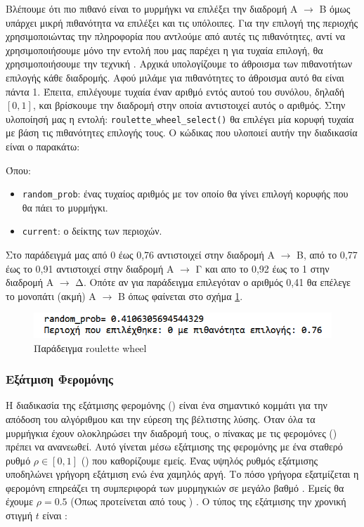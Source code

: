 Βλέπουμε ότι πιο πιθανό είναι το μυρμήγκι να επιλέξει την διαδρομή Α $\rightarrow$ Β όμως υπάρχει μικρή πιθανότητα να επιλέξει και τις υπόλοιπες. Για την επιλογή της περιοχής χρησιμοποιώντας την πληροφορία που αντλούμε από αυτές τις πιθανότητες, αντί να χρησιμοποιήσουμε μόνο την εντολή  που μας παρέχει η  για τυχαία επιλογή, θα χρησιμοποιήσουμε την τεχνική  \cite{lipowski2012roulette}. Αρχικά υπολογίζουμε το άθροισμα των πιθανοτήτων επιλογής κάθε διαδρομής. Αφού μιλάμε για πιθανότητες το άθροισμα αυτό θα είναι πάντα 1. Έπειτα, επιλέγουμε τυχαία έναν αριθμό εντός αυτού του συνόλου, δηλαδή $[0,1]$, και βρίσκουμε την διαδρομή στην οποία αντιστοιχεί αυτός ο αριθμός.
Στην υλοποίησή μας η εντολή: \verb|roulette_wheel_select()| θα επιλέγει μία κορυφή τυχαία με βάση τις πιθανότητες επιλογής τους. Ο κώδικας που υλοποιεί αυτήν την διαδικασία είναι ο παρακάτω: 

Όπου:
\begin{itemize}
    \item \verb|random_prob|: ένας τυχαίος αριθμός με τον οποίο θα γίνει επιλογή κορυφής που θα πάει το μυρμήγκι.
    \item \verb|current|: ο δείκτης των περιοχών.
\end{itemize}

Στο παράδειγμά μας από 0 έως 0,76 αντιστοιχεί στην διαδρομή Α $\rightarrow$ Β, από το 0,77 έως το 0,91 αντιστοιχεί στην διαδρομή Α $\rightarrow$ Γ και απο το 0,92 έως το 1 στην διαδρομή Α $\rightarrow$ Δ. Οπότε αν για παράδειγμα επιλεγόταν ο αριθμός 0,41 θα επέλεγε το μονοπάτι (ακμή) Α $\rightarrow$ Β όπως φαίνεται στο σχήμα \ref{roulette}.

\begin{figure}[b]
    \centering
    \includegraphics[scale=0.9]{2947_thesis/pictures/roulette_wheel_example.png} 
    \caption{Παράδειγμα roulette wheel}
    \label{roulette}
\end{figure}

\subsubsection{Εξάτμιση Φερομόνης}

Η διαδικασία της εξάτμισης φερομόνης () είναι ένα σημαντικό κομμάτι για την απόδοση του αλγόριθμου και την εύρεση της βέλτιστης λύσης. Όταν όλα τα μυρμήγκια έχουν ολοκληρώσει την διαδρομή τους, ο πίνακας με τις φερομόνες () πρέπει να ανανεωθεί. Αυτό γίνεται μέσω εξάτμισης της φερομόνης με ένα σταθερό ρυθμό $ρ \in [0,1]$ () που καθορίζουμε εμείς. Ένας υψηλός ρυθμός εξάτμισης υποδηλώνει γρήγορη εξάτμιση ενώ ένα χαμηλός αργή. Το πόσο γρήγορα εξατμίζεται η φερομόνη επηρεάζει τη συμπεριφορά των μυρμηγκιών σε μεγάλο βαθμό \cite{dawson2013improving}. Εμείς θα έχουμε $ρ=0.5$ (Όπως προτείνεται από τους ) \cite{dorigo2003ant}. Ο τύπος της εξάτμισης την χρονική στιγμή $t$ είναι \cite{blum2005ant, mpikou2013euretikoi}:

